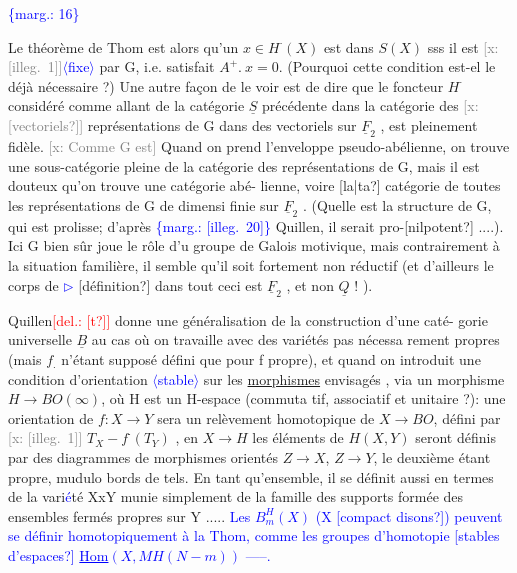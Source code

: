 \documentclass[11pt]{article}
\newcommand{\scanpage}[1]{\par\bigskip\noindent{\small\sffamily[scan #1]}\par}
\newcommand{\mspage}[1]{{\small\sffamily[p.\,#1]}}
\newcommand{\hand}[1]{\textcolor{blue}{#1}}
\newcommand{\inserted}[2][]{\textcolor{blue}{$\langle$#2$\rangle$}}
\newcommand{\margin}[1]{\textcolor{blue}{\{\textsf{marg.:} #1\}}}
\newcommand{\deleted}[1]{\textcolor{red}{[\textsf{del.:} #1]}}
\newcommand{\xout}[1]{\textcolor{gray}{[\textsf{x:} #1]}}
\newcommand{\uline}[1]{\underline{#1}}
\newcommand{\unsure}[1]{[#1?]}
\newcommand{\illegible}[1]{[\textsf{illeg.\ #1}]}
\begin{document}
\margin{16}

\clearpage
\scanpage{162-5/17}
\mspage{16}

Le théorème de Thom est alors qu'un $x \in H^{\cdot}(X)$ est dans $S(X)$ sss il est
\xout{\illegible{1}}\inserted[typed]{fixe} par G, i.e. satisfait $A^{+}.\ x = 0$. (Pourquoi cette condition est-el%
le déjà nécessaire ?) Une autre façon de le voir est de dire que le
foncteur $H^{\cdot}$ considéré comme allant de la catégorie $\underline{S}$ précédente dans
la catégorie des \xout{\unsure{vectoriels}} représentations de G dans des vectoriels
sur $\underline{F}_2$ , est pleinement fidèle. \xout{Comme G est} Quand on prend l'enveloppe
pseudo-abélienne, on trouve une sous-catégorie pleine de la catégorie des
représentations de G, mais il est douteux qu'on trouve une catégorie abé-%
lienne, voire \unsure{la|ta} catégorie de toutes les représentations de G de dimensi
finie sur $\underline{F}_2$ . (Quelle est la structure de G, qui est prolisse; d'après
\margin{\illegible{20}}
Quillen, il serait pro-\unsure{nilpotent} ....). Ici G bien sûr joue le rôle d'u
groupe de Galois motivique, mais contrairement à la situation familière,
il semble qu'il soit fortement non réductif (et d'ailleurs le corps de
\hand{$\triangleright$} \unsure{définition} dans tout ceci est $\underline{F}_2$ , et non $\underline{Q}$ ! ).

Quillen\deleted{\unsure{t}} donne une généralisation de la construction d'une caté-%
gorie universelle $\underline{B}$ au cas où on travaille avec des variétés pas nécessa
rement propres (mais $f_{.}$ n'étant supposé défini que pour f propre), et
quand on introduit une condition d'orientation \inserted[typed]{stable} sur les \uline{morphismes}
envisagés , via un morphisme $H \to BO(\infty)$, où H est un H-espace (commuta
tif, associatif et unitaire ?): une orientation de $f:X \to Y$ sera un
relèvement homotopique de $X \to BO$, défini par \xout{\illegible{1}} $T_X - f^{\cdot}(T_Y)$ , en $X \to H$
les éléments de $H(X,Y)$ seront définis par des diagrammes de morphismes
orientés $Z \to X$, $Z \to Y$, le deuxième étant propre, mudulo bords de tels.
En tant qu'ensemble, il se définit aussi en termes de la vari\hand{é}té XxY
munie simplement de la famille des supports formée des ensembles fermés
propres sur Y ..... \hand{Les $B^{H}_{m}(X)$ (X \unsure{compact disons}) peuvent}
\hand{se définir homotopiquement à la Thom, comme les groupes d'homotopie}
\hand{\unsure{stables d'espaces} \uline{Hom}$(X, MH(N-m))$ -----.}
\end{document}
